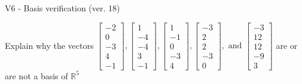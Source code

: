\begin{exercise}
  \begin{exerciseTitle}V6 - Basis verification (ver. 18)\end{exerciseTitle}
  \begin{exerciseStatement}
    Explain why the vectors \(\left[\begin{array}{r}
-2 \\
0 \\
-3 \\
4 \\
-1
\end{array}\right] , \left[\begin{array}{r}
1 \\
-4 \\
-4 \\
3 \\
-1
\end{array}\right] , \left[\begin{array}{r}
1 \\
-1 \\
0 \\
-3 \\
4
\end{array}\right] , \left[\begin{array}{r}
-3 \\
2 \\
2 \\
-3 \\
0
\end{array}\right] , \text{ and } \left[\begin{array}{r}
-3 \\
12 \\
12 \\
-9 \\
3
\end{array}\right]\) are or are not a basis of \(\mathbb{R}^5\)	



\end{exerciseStatement}
\end{exercise}

